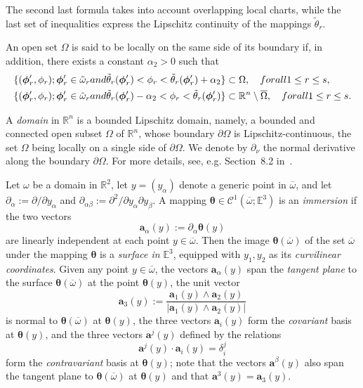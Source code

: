 \documentclass{amsart}
\begin{document}
The second last formula takes into account overlapping local charts, while the last set of inequalities express the Lipschitz continuity of the mappings $\tilde{\theta}_r$.

An open set $\Omega$ is said to be locally on the same side of its boundary if, in addition, there exists a constant $\alpha_2>0$ such that
\begin{align*}
	\{(\bm{\phi}'_r,\phi_r);\bm{\phi}'_r \in\tilde{\omega}_r \textup{ and }\tilde{\theta}_r(\bm{\phi}'_r) < \phi_r < \tilde{\theta}_r(\bm{\phi}'_r)+\alpha_2\}&\subset \Omega,\quad\textup{ for all } 1\le r\le s,\\
	\{(\bm{\phi}'_r,\phi_r);\bm{\phi}'_r \in\tilde{\omega}_r \textup{ and }\tilde{\theta}_r(\bm{\phi}'_r)-\alpha_2 < \phi_r < \tilde{\theta}_r(\bm{\phi}'_r)\}&\subset \mathbb{R}^n\setminus\overline{\Omega},\quad\textup{ for all } 1\le r\le s.
\end{align*}

A \emph{domain} in $\mathbb{R}^n$ is a bounded Lipschitz domain, namely, a bounded and connected open subset $\Omega$ of $\mathbb{R}^n$, whose boundary $\partial \Omega$ is Lipschitz-continuous, the set $\Omega$ being locally on a single side of $\partial \Omega$. We denote by $\partial_{\nu}$ the normal derivative along the boundary $\partial\Omega$. For more details, see, e.g. Section~8.2 in~\cite{Ciarlet2025}.

Let $\omega$ be a domain in $\mathbb{R}^2$, let $y = (y_\alpha)$ denote a generic point in $\overline{\omega}$, and let $\partial_\alpha := \partial / \partial y_\alpha$ and $\partial_{\alpha\beta} := \partial^2/\partial y_\alpha \partial y_\beta$. A mapping $\bm{\theta} \in \mathcal{C}^1(\overline{\omega}; \mathbb{E}^3)$ is an \emph{immersion} if the two vectors
$$
\bm{a}_\alpha(y) := \partial_\alpha \bm{\theta}(y)
$$
are linearly independent at each point $y \in \overline{\omega}$. Then the image $\bm{\theta}(\overline{\omega})$ of the set $\overline{\omega}$ under the mapping $\bm{\theta}$ is a \emph{surface in} $\mathbb{E}^3$, equipped with $y_1, y_2$ as its \emph{curvilinear coordinates}. Given any point $y\in \overline{\omega}$, the vectors $\bm{a}_\alpha(y)$ span the \emph{tangent plane} to the surface $\bm{\theta}(\overline{\omega})$ at the point $\bm{\theta}(y)$, the unit vector
$$
\bm{a}_3(y) := \frac{\bm{a}_1(y) \wedge \bm{a}_2(y)}{|\bm{a}_1(y) \wedge \bm{a}_2(y)|}
$$
is normal to $\bm{\theta}(\overline{\omega})$ at $\bm{\theta} (y)$, the three vectors $\bm{a}_i(y)$ form the \emph{covariant} basis at $\bm{\theta}(y)$, and the three vectors $\bm{a}^j(y)$ defined by the relations
$$
\bm{a}^j(y) \cdot \bm{a}_i(y) = \delta^j_i
$$
form the \emph{contravariant} basis at $\bm{\theta}(y)$; note that the vectors $\bm{a}^\beta (y)$ also span the tangent plane to $\bm{\theta}(\overline{\omega})$ at $\bm{\theta}(y)$ and that $\bm{a}^3(y) = \bm{a}_3(y)$.
\end{document}
